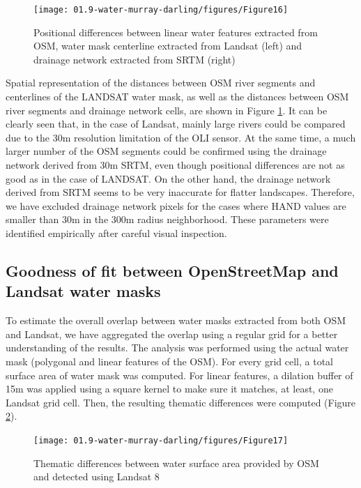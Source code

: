 \begin{figure}
	\centering
	\texttt{[image: 01.9-water-murray-darling/figures/Figure16]}
	\caption{Positional differences between linear water features extracted from OSM, water mask centerline extracted from Landsat (left) and drainage network extracted from \gls{SRTM} (right)}
	\label{fig:au-positional-differences-map}
\end{figure}

Spatial representation of the distances between OSM river segments and centerlines of the LANDSAT water mask, as well as the distances between OSM river segments and drainage network cells, are shown in Figure \ref{fig:au-positional-differences-map}. It can be clearly seen that, in the case of Landsat, mainly large rivers could be compared due to the 30m resolution limitation of the OLI sensor. At the same time, a much larger number of the OSM segments could be confirmed using the drainage network derived from 30m \gls{SRTM}, even though positional differences are not as good as in the case of LANDSAT. On the other hand, the drainage network derived from \gls{SRTM} seems to be very inaccurate for flatter landscapes. Therefore, we have excluded drainage network pixels for the cases where \gls{HAND} values are smaller than 30m in the 300m radius neighborhood. These parameters were identified empirically after careful visual inspection.

\subsection{Goodness of fit between OpenStreetMap and Landsat water masks}
To estimate the overall overlap between water masks extracted from both OSM and Landsat, we have aggregated the overlap using a regular grid for a better understanding of the results. The analysis was performed using the actual water mask (polygonal and linear features of the OSM). For every grid cell, a total surface area of water mask was computed. For linear features, a dilation buffer of 15m was applied using a square kernel to make sure it matches, at least, one Landsat grid cell. Then, the resulting thematic differences were computed (Figure \ref{fig:au-positional-differences-thematic}).

\begin{figure}
	\centering
	\texttt{[image: 01.9-water-murray-darling/figures/Figure17]}
	\caption{Thematic differences between water surface area provided by OSM and detected using Landsat 8}
	\label{fig:au-positional-differences-thematic}
\end{figure}

